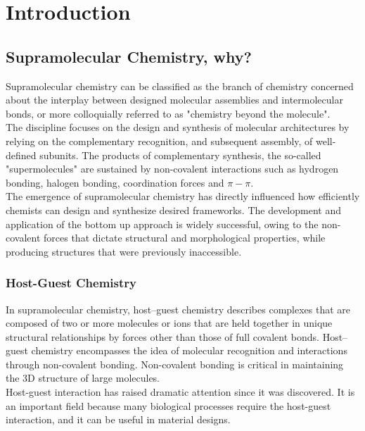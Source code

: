 \documentclass[../Master.tex]{subfiles}
\begin{document}
\chapter{Introduction}
\section{Supramolecular Chemistry, why?}\label{sec:supramolecular-chemistry}
Supramolecular chemistry can be classified as the branch of chemistry concerned about the interplay between designed molecular assemblies and intermolecular bonds, or more colloquially referred to as "chemistry beyond the molecule"\cite{desiraju_chemistry_2001}. \\
The discipline focuses on the design and synthesis of molecular architectures by relying on the complementary recognition, and subsequent assembly, of well-defined subunits. The products of complementary synthesis, the so-called "supermolecules" are sustained by non-covalent interactions such as hydrogen bonding, halogen bonding, coordination forces and \(\pi-\pi\). \\
The emergence of supramolecular chemistry has directly influenced how efficiently chemists can design and synthesize desired frameworks. The development and application of the bottom up approach is widely successful, owing to the non-covalent forces that dictate structural and morphological properties, while producing structures that were previously inaccessible.

\subsection{Host-Guest Chemistry}\label{subsec:host-guest-chemistry}
In supramolecular chemistry, host–guest chemistry describes complexes that are composed of two or more molecules or ions that are held together in unique structural relationships by forces other than those of full covalent bonds. Host–guest chemistry encompasses the idea of molecular recognition and interactions through non-covalent bonding. Non-covalent bonding is critical in maintaining the 3D structure of large molecules.\\
Host-guest interaction has raised dramatic attention since it was discovered. It is an important field because many biological processes require the host-guest interaction, and it can be useful in material designs.
\end{document}

